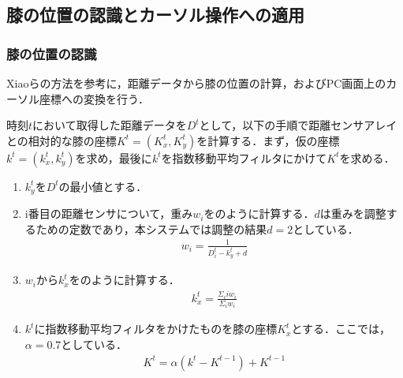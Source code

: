\documentclass[submit, techrep]{ipsj}
\begin{document}

\subsection{膝の位置の認識とカーソル操作への適用}
\subsubsection{膝の位置の認識}
Xiao\cite{Xiao:2018:LOP:3173574.3173669}らの方法を参考に，距離データから膝の位置の計算，およびPC画面上のカーソル座標への変換を行う．

時刻$t$において取得した距離データを$D^t$として，以下の手順で距離センサアレイとの相対的な膝の座標$K^t=(K^t_x, K^t_y)$を計算する．まず，仮の座標$k^t=(k^t_x, k^t_y)$を求め，最後に$k^t$を指数移動平均フィルタにかけて$K^t$を求める．
\begin{enumerate}
	\item $k^t_y$を$D^t$の最小値とする．
	\item i番目の距離センサについて，重み$w_i$をのように計算する．$d$は重みを調整するための定数であり，本システムでは調整の結果$d=2$としている．
	\begin{eqnarray}
		\label{eq:weight}
		w_i = \frac{1}{D^t_i - k^t_y + d}
	\end{eqnarray}
	\item $w_i$から$k^t_x$をのように計算する．
	\begin{eqnarray}
		\label{eq:calc_x}
			k^t_x = \frac{\Sigma_i iw_i}{\Sigma_i w_i}
	\end{eqnarray}
	\item $k^t$に指数移動平均フィルタをかけたものを膝の座標$K^t_x$とする．ここでは，$\alpha=0.7$としている．
\begin{eqnarray}
	\label{eq:filter}
	K^t = \alpha (k^t - K^{t-1}) + K^{t-1}
	\end{eqnarray}
\end{enumerate}
\end{document}
